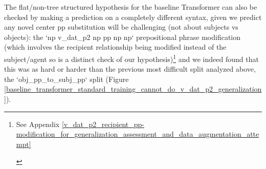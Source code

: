 \documentclass[11pt]{article}
\begin{document}
The flat/non-tree structured hypothesis for the baseline Transformer can also be checked by making a prediction on a completely different syntax, given we predict any novel center pp substitution will be challenging (not about subjects vs objects): the `np v\_dat\_p2 np pp np np` prepositional phrase modification (which involves the recipient relationship being modified instead of the subject/agent so is a distinct check of our hypothesis)\footnote{\begin{footnotesize}See Appendix \ref{v_dat_p2_recipient_pp-modification_for_generalization_assessment_and_data_augmentation_attempt}\end{footnotesize}} and we indeed found that this was as hard or harder than the previous most difficult split analyzed above, the `obj\_pp\_to\_subj\_pp` split (Figure \ref{baseline_transformer_standard_training_cannot_do_v_dat_p2_generalization}).
\end{document}
